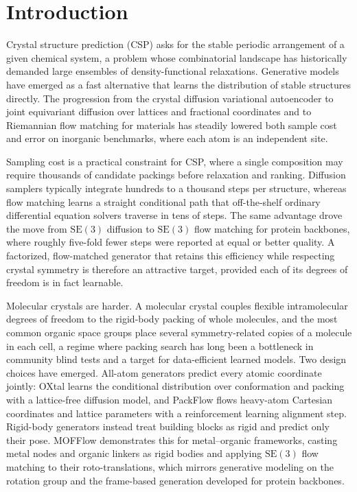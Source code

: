 \documentclass[11pt]{article}
\begin{document}
\section{Introduction}

Crystal structure prediction (CSP) asks for the stable periodic arrangement of
a given chemical system, a problem whose combinatorial landscape has
historically demanded large ensembles of density-functional relaxations.
Generative models have emerged as a fast alternative that learns the
distribution of stable structures directly. The progression from the crystal
diffusion variational autoencoder\cite{xie2022cdvae} to joint equivariant
diffusion over lattices and fractional coordinates\cite{jiao2023diffcsp} and to
Riemannian flow matching for materials\cite{miller2024flowmm} has steadily
lowered both sample cost and error on inorganic benchmarks, where each atom is
an independent site.

Sampling cost is a practical constraint for CSP, where a single composition may
require thousands of candidate packings before relaxation and ranking. Diffusion
samplers typically integrate hundreds to a thousand steps per structure, whereas
flow matching learns a straight conditional path that off-the-shelf ordinary
differential equation solvers traverse in tens of
steps\cite{lipman2023flowmatching,chen2024riemannian}. The same advantage drove
the move from $\mathrm{SE}(3)$ diffusion to $\mathrm{SE}(3)$ flow matching for
protein backbones, where roughly five-fold fewer steps were reported at equal or
better quality\cite{yim2023se3diffusion,yim2023frameflow}. A factorized,
flow-matched generator that retains this efficiency while respecting crystal
symmetry is therefore an attractive target, provided each of its degrees of
freedom is in fact learnable.

Molecular crystals are harder. A molecular crystal couples flexible
intramolecular degrees of freedom to the rigid-body packing of whole molecules,
and the most common organic space groups place several symmetry-related copies
of a molecule in each cell, a regime where packing search has long been a
bottleneck in community blind tests\cite{price2023blindtest7} and a target for
data-efficient learned models\cite{obrien2021dataefficient}. Two design choices
have emerged. All-atom
generators predict every atomic coordinate jointly: OXtal\cite{jin2025oxtal}
learns the conditional distribution over conformation and packing with a
lattice-free diffusion model, and PackFlow\cite{subramanian2026packflow} flows
heavy-atom Cartesian coordinates and lattice parameters with a reinforcement
learning alignment step. Rigid-body generators instead treat building blocks as
rigid and predict only their pose. MOFFlow\cite{kim2025mofflow} demonstrates
this for metal--organic frameworks, casting metal nodes and organic linkers as
rigid bodies and applying $\mathrm{SE}(3)$ flow matching to their
roto-translations, which mirrors generative modeling on the rotation
group\cite{leach2022so3} and the frame-based generation developed for protein
backbones\cite{yim2023se3diffusion,yim2023frameflow}.
\end{document}
